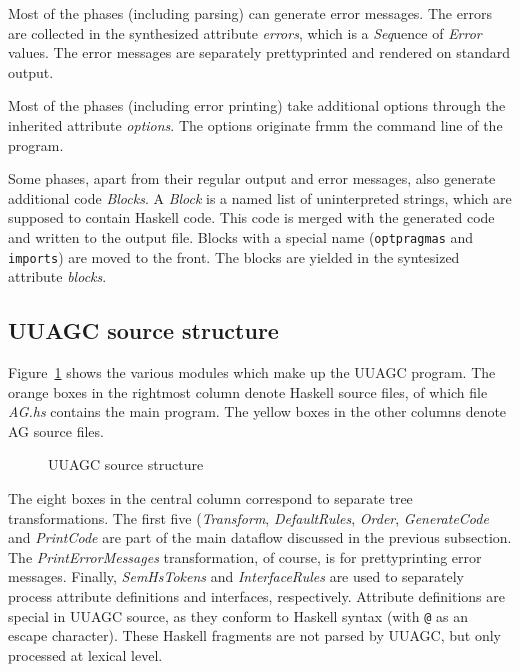 \documentclass[twoside]{article}
\newcommand{\simplepicture}[2]{\centerline{\mbox{\texttt{[image: figs/\#2]}}}}
\begin{document}
Most of the phases (including parsing) can generate error messages.
The errors are collected in the synthesized attribute {\em errors},
which is a {\em Seq}uence of {\em Error} values.
The error messages are separately prettyprinted and rendered on standard output.

Most of the phases (including error printing) take additional options
through the inherited attribute {\em options}.
The options originate frmm the command line of the program.

Some phases, apart from their regular output and error messages, also generate additional code {\em Blocks}.
A {\em Block} is a named list of uninterpreted strings, which are supposed to contain Haskell code.
This code is merged with the generated code and written to the output file.
Blocks with a special name (\verb"optpragmas" and \verb"imports") are moved to the front.
The blocks are yielded in the syntesized attribute {\em blocks}.



\subsection{UUAGC source structure}

Figure~\ref{fig.uuagc-include} shows the various modules which make up the UUAGC program.
The orange boxes in the rightmost column denote Haskell source files,
of which file {\em AG.hs} contains the main program.
The yellow boxes in the other columns denote AG source files.
\begin{figure}[htbp]
\raisebox{0mm}{\simplepicture{0.7}{uuagc-include}}
\caption{UUAGC source structure}
\label{fig.uuagc-include}
\end{figure}

The eight boxes in the central column correspond to separate tree transformations.
The first five ({\em Transform}, {\em DefaultRules}, {\em Order}, {\em GenerateCode} and
{\em PrintCode} are part of the main dataflow discussed in the previous subsection.
The {\em PrintErrorMessages} transformation, of course, is for prettyprinting error messages.
Finally, {\em SemHsTokens} and {\em InterfaceRules} are used to separately process attribute definitions
and interfaces, respectively.
Attribute definitions are special in UUAGC source, as they conform to Haskell syntax
(with \verb"@" as an escape character). These Haskell fragments are not parsed by UUAGC,
but only processed at lexical level.
\end{document}
